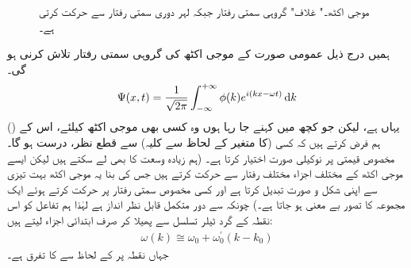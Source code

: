 \begin{figure}
\centering
{}
\caption{موجی اکٹھ۔" غلاف" گروہی سمتی  رفتار جبکہ لہر دوری سمتی  رفتار سے حرکت کرتی ہے۔}
\label{شکل_غیر_تابع_موجی_اکٹھ_رفتاریں}
\end{figure}
 ہمیں درج ذیل عمومی صورت کے موجی اکٹھ کی گروہی سمتی رفتار تلاش کرنی ہو گی۔ 
\begin{align*}
\Psi (x,t) = \frac{1}{\sqrt{2\pi}} \int_{- \infty}^{+ \infty} \phi (k) e^{i(kx - \omega t)} \dif k
\end{align*}
 (یہاں  ہے، لیکن جو کچھ میں کہنے جا رہا ہوں وہ کسی بھی موجی اکٹھ کیلئے، اس کے  ( کا متغیر  کے لحاظ سے کلیہ) سے قطع نظر،  درست ہو گا۔)  ہم فرض کرتے ہیں کہ کسی مخصوص قیمتی  پر   نوکیلی صورت اختیار کرتا ہے۔ (ہم زیادہ وسعت کا  بھی لے سکتے ہیں لیکن ایسے موجی اکٹھ کے مختلف اجزاء مختلف رفتار سے حرکت کرتے ہیں جس کی بنا یہ موجی اکٹھ بہت تیزی سے اپنی شکل و صورت تبدیل کرتا ہے اور کسی مخصوص سمتی رفتار پر حرکت کرتے ہوئے ایک مجموعہ  کا تصور بے معنی ہو جاتا ہے۔) چونکہ   سے دور متکمل قابل نظر انداز ہے لہٰذا ہم تفاعل  کو اس نقطہ کے گرد ٹیلر تسلسل سے پھیلا کر صرف ابتدائی اجزاء لیتے ہیں:
\begin{align*}
\omega (k) \cong \omega_{0} + \omega_{0}^{'} (k-k_{0})
\end{align*}
 جہاں نقطہ  پر  کے لحاظ سے  کا تفرق  ہے۔
 
